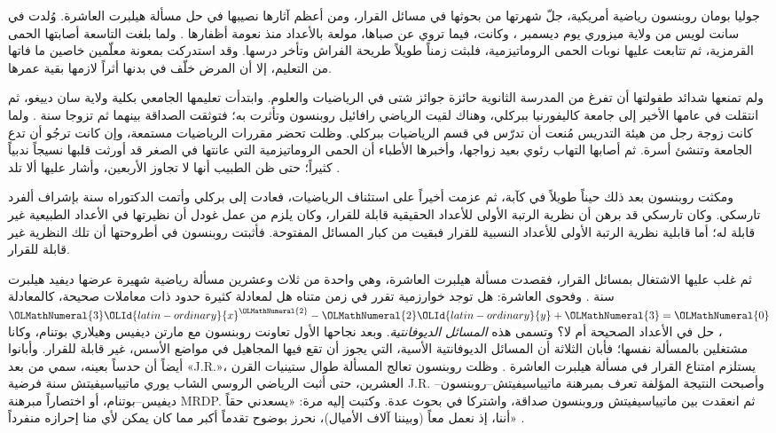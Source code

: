 \documentclass[../../../include/open-logic-section]{subfiles}
\begin{document}



جوليا بومان روبنسون رياضية أمريكية، جلّ شهرتها من بحوثها في مسائل القرار،
ومن أعظم آثارها نصيبها في حل مسألة هيلبرت العاشرة. وُلدت في سانت لويس من
ولاية ميزوري يوم  ديسمبر ، وكانت، فيما تروي عن صباها، مولعة بالأعداد
منذ نعومة أظفارها \citep[4]{Reid1986}. ولما بلغت التاسعة أصابتها الحمى
القرمزية، ثم تتابعت عليها نوبات الحمى الروماتيزمية، فلبثت زمناً طويلاً
طريحة الفراش وتأخر درسها. وقد استدركت بمعونة معلّمين خاصين ما فاتها من
التعليم، إلا أن المرض خلّف في بدنها أثراً لازمها بقية عمرها.

ولم تمنعها شدائد طفولتها أن تفرغ من المدرسة الثانوية حائزة جوائز شتى في
الرياضيات والعلوم. وابتدأت تعليمها الجامعي بكلية ولاية سان دييغو، ثم
انتقلت في عامها الأخير إلى جامعة كاليفورنيا ببركلي، وهناك لقيت الرياضي
رافائيل روبنسون وتأثرت به؛ فتوثقت الصداقة بينهما ثم تزوجا سنة . ولما
كانت زوجة رجل من هيئة التدريس مُنعت أن تدرّس في قسم الرياضيات ببركلي.
وظلت تحضر مقررات الرياضيات مستمعة، وإن كانت ترجُو أن تدع الجامعة وتنشئ
أسرة. ثم أصابها التهاب رئوي بعيد زواجها، وأخبرها الأطباء أن الحمى
الروماتيزمية التي عانتها في الصغر قد أورثت قلبها نسيجاً ندبياً كثيراً؛
حتى ظن الطبيب أنها لا تجاوز الأربعين، وأشار عليها ألا تلد
\citep[13]{Reid1986}.

ومكثت روبنسون بعد ذلك حيناً طويلاً في كآبة، ثم عزمت أخيراً على استئناف
الرياضيات، فعادت إلى بركلي وأتمت الدكتوراه سنة  بإشراف ألفرد تارسكي.
وكان تارسكي قد برهن أن نظرية الرتبة الأولى للأعداد الحقيقية قابلة للقرار،
وكان يلزم من عمل غودل أن نظيرتها في الأعداد الطبيعية غير قابلة له؛ أما
قابلية نظرية الرتبة الأولى للأعداد النسبية للقرار فبقيت من كبار المسائل
المفتوحة. فأثبتت روبنسون في أطروحتها \citeyearpar{Robinson1949} أن تلك
النظرية غير قابلة للقرار.

ثم غلب عليها الاشتغال بمسائل القرار، فقصدت مسألة هيلبرت العاشرة، وهي واحدة
من ثلاث وعشرين مسألة رياضية شهيرة عرضها ديفيد هيلبرت سنة . وفحوى
العاشرة: هل توجد خوارزمية تقرر في زمن متناه هل لمعادلة كثيرة حدود ذات معاملات
صحيحة، كالمعادلة $\OLMathNumeral{3}\OLId{latin-ordinary}{x}^\OLMathNumeral{2} - \OLMathNumeral{2}\OLId{latin-ordinary}{y} +\OLMathNumeral{3} = \OLMathNumeral{0}$، حل في الأعداد الصحيحة أم لا؟ وتسمى
هذه \emph{المسائل الديوفانتية}. وبعد نجاحها الأول تعاونت روبنسون مع مارتن
ديفيس وهيلاري بوتنام، وكانا مشتغلين بالمسألة نفسها؛ فأبان الثلاثة أن
المسائل الديوفانتية الأسية، التي يجوز أن تقع فيها المجاهيل في مواضع
الأسس، غير قابلة للقرار. وأبانوا أيضاً أن حدساً بعينه، سمي من بعد «J.R.»،
يستلزم امتناع القرار في مسألة هيلبرت العاشرة
\citep{DavisPutnamRobinson1961}. وظلت روبنسون تعالج المسألة طوال ستينيات
القرن العشرين، حتى أثبت الرياضي الروسي الشاب يوري ماتيياسيفيتش سنة 
فرضية J.R. وأصبحت النتيجة المؤلفة تعرف بمبرهنة
ماتيياسيفيتش--روبنسون--ديفيس--بوتنام، أو اختصاراً مبرهنة MRDP. ثم انعقدت
بين ماتيياسيفيتش وروبنسون صداقة، واشتركا في بحوث عدة. وكتبت إليه مرة:
«يسعدني حقاً أننا، إذ نعمل معاً (وبيننا آلاف الأميال)، نحرز بوضوح تقدماً
أكبر مما كان يمكن لأي منا إحرازه منفرداً» \citep[45]{Matijasevich1992}.
\end{document}
